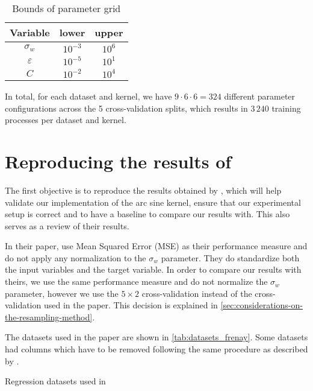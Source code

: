\begin{table}[H]
    \caption{Bounds of parameter grid}%
    \label{tab:paramgrid}
    \begin{tabular}{ccc}
        \toprule
        Variable      & lower     & upper  \\
        \midrule
        $\sigma_w$    & $10^{-3}$ & $10^6$ \\
        $\varepsilon$ & $10^{-5}$ & $10^1$ \\
        $C$           & $10^{-2}$ & $10^4$ \\
        \bottomrule
    \end{tabular}
\end{table}

In total, for each dataset and kernel, we have $9 \cdot 6 \cdot 6 = 324$ different
parameter configurations across the 5 cross-validation splits, which
results in $3\,240$ training processes per dataset and kernel.

\section{Reproducing the results of \texorpdfstring{\citeauthor{frenayParameterinsensitiveKernelExtreme2011}}{Frénay and Verleysen}}
\label{sec:reproducing-frenay}

The first objective is to reproduce the results obtained by
\textcite{frenayParameterinsensitiveKernelExtreme2011}, which will help validate
our implementation of the arc sine kernel, ensure that our experimental setup is
correct and to have a baseline to compare our results with. This also serves as
a review of their results.

In their paper, \citeauthor{frenayParameterinsensitiveKernelExtreme2011} use
Mean Squared Error (MSE) as their performance measure and do not apply any
normalization to the $\sigma_w$ parameter. They do standardize both the input
variables and the target variable. In order to compare our results with theirs,
we use the same performance measure and do not normalize the $\sigma_w$ parameter,
however we use the $5\times2$ cross-validation instead of the cross-validation used
in the paper. This decision is explained in \cref{sec:considerations-on-the-resampling-method}.

The datasets used in the paper are shown in \cref{tab:datasets_frenay}. Some
datasets had columns which have to be removed following the same procedure as
described by \textcite{frenayParameterinsensitiveKernelExtreme2011}.
\begin{table}[H]
    \caption{Regression datasets used in \cite{frenayParameterinsensitiveKernelExtreme2011}}
    \label{tab:datasets_frenay}
    
\end{table}


